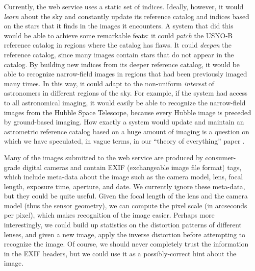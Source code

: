 Currently, the \an web service uses a static set of indices.  Ideally,
however, it would \emph{learn} about the sky and constantly update its
reference catalog and indices based on the stars that it finds in the
images it encounters.  A system that did this would be able to achieve
some remarkable feats: it could \emph{patch} the USNO-B reference
catalog in regions where the catalog has flaws.  It could
\emph{deepen} the reference catalog, since many images contain stars
that do not appear in the catalog.  By building new indices from its
deeper reference catalog, it would be able to recognize narrow-field
images in regions that had been previously imaged many times.  In this
way, it could adapt to the non-uniform \emph{interest} of astronomers
in different regions of the sky.  For example, if the system had
access to all astronomical imaging, it would easily be able to
recognize the narrow-field images from the Hubble Space Telescope,
because every Hubble image is preceded by ground-based imaging.  How
exactly a system would update and maintain an astrometric reference
catalog based on a huge amount of imaging is a question on which we
have speculated, in vague terms, in our ``theory of everything'' paper
\cite{theoryofeverything}.


Many of the images submitted to the \an web service are produced by
consumer-grade digital cameras and contain EXIF (exchangeable image
file format) tags, which include meta-data about the image such as the
camera model, lens, focal length, exposure time, aperture, and date.
We currently ignore these meta-data, but they could be quite useful.
Given the focal length of the lens and the camera model (thus the
sensor geometry), we can compute the pixel scale (in arcseconds per
pixel), which makes recognition of the image easier.  Perhaps more
interestingly, we could build up statistics on the distortion patterns
of different lenses, and given a new image, apply the inverse
distortion before attempting to recognize the image.  Of course, we
should never completely trust the information in the EXIF headers, but
we could use it as a possibly-correct hint about the image.




